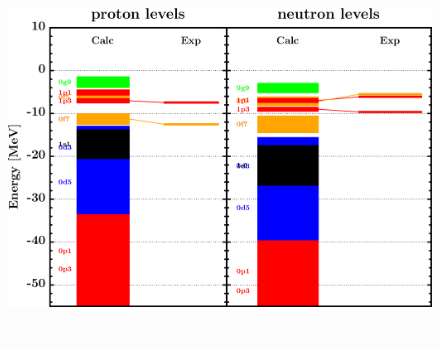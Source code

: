 \documentclass[twocolumn,secnumarabic,amssymb, nobibnotes, aps, prl,
superscriptaddress, nobalancelastpage]{revtex4}
\begin{document}
\begin{figure}[!htb]
\begin{minipage}{0.4\linewidth}
        \label{DOM_ni64_chargeDensity}
    \end{minipage}
    \begin{minipage}{0.35\linewidth}
        \centering
        \includegraphics[width=\linewidth]{figures/ni64_SPLevels.png}
        \label{DOM_ni64_SPLevels}
    \end{minipage}
    \begin{minipage}{0.4\linewidth}
        \centering
        \includegraphics[width=\linewidth]{figures/ni64_RMSRadius.png}

\end{minipage}
\end{figure}
\end{document}
